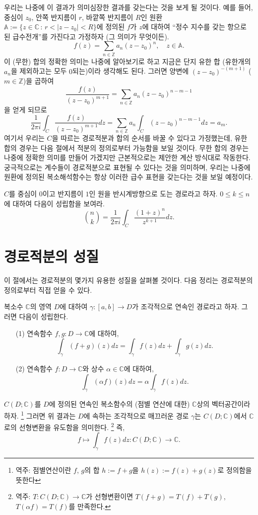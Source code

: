 우리는 나중에 이 결과가 의미심장한 결과를 갖는다는 것을 보게 될 것이다.
예를 들어, 
중심이 $z_0$, 안쪽 반지름이 $r$, 바깥쪽 반지름이 $R$인 
원환 $\mathbb A := \{ z\in\mathbb C \,:\, r<|z-z_0|<R \}$에 정의된
$f$가 $z$에 대하여 ``정수 지수를 갖는 항으로 된 급수전개''를 가진다고 가정하자 
(그 의미가 무엇이든).
\[
f(z) = \sum_{n\in\mathbb Z} a_n (z-z_0)^n, \quad z\in \mathbb A.
\]
이 (무한) 합의 정확한 의미는 나중에 알아보기로 하고
지금은 단지 유한 합 (유한개의 $a_n$을 제외하고는 모두 $0$되는)이라 생각해도 된다.
그러면  양변에 $(z-z_0)^{-(m+1)}$ ($m\in \mathbb Z$)을 곱하여 
\[
\dfrac{f(z)}{(z-z_0)^{m+1}} = \sum_{n\in\mathbb Z} a_n (z-z_0)^{n-m-1}
\]
을 얻게 되므로
\[
\dfrac1{2\pi i} \int_C \frac{f(z)}{(z-z_0)^{m+1}} dz
= \sum_{n\in\mathbb Z} a_n \int_C (z-z_0)^{n-m-1}dz = a_m.
\]
여기서 우리는 $C$을 따르는 경로적분과 합의 순서를 바꿀 수 있다고 가정했는데,
유한 합의 경우는 다음 절에서 적분의 정의로부터 가능함을 보일 것이다.
무한 합의 경우는 나중에 정확한 의미를 만들어 가겠지만 근본적으로는
제안한 계산 방식대로 작동한다.
궁극적으로는 계수들이 경로적분으로 표현될 수 있다는 것을 의미하며,
우리는 나중에 원환에 정의된 복소해석함수는 항상 이러한 급수 표현을 갖는다는 것을
보일 예정이다.

\begin{salt_exercise} \label{ex-3-5}
$C$를 중심이 $0$이고 반지름이 $1$인 원을 반시계방향으로 도는 경로라고 하자.
$0\le k \le n$에 대하여 다음이 성립함을 보여라.
\[
{n \choose k} = \dfrac1{2\pi i}\int_C \dfrac{(1+z)^n}{z^{k+1}} dz.
\]
\end{salt_exercise}

\section{경로적분의 성질}

이 절에서는 경로적분의 몇가지 유용한 성질을 살펴볼 것이다.
다음 정리는 경로적분의 정의로부터 직접 얻을 수 있다.

\begin{salt_prop} \label{prop-3-1}
복소수 $\mathbb C$의 영역 $D$에 대하여
$\gamma: [a,b] \to D$가 조각적으로 연속인 경로라고 하자.
그러면 다음이 성립한다.
\begin{itemize}
\item[(1)] 연속함수 $f,g : D \to \mathbb C$에 대하여,
\[
\int_\gamma (f+g)(z) dz = \int_\gamma f(z)dz + \int_\gamma g(z)dz.
\]
\item[(2)] 연속함수 $f : D \to \mathbb C$와 상수 $\alpha\in\mathbb C$에 대하여,
\[
\int_\gamma  (\alpha f)(z)dz = \alpha \int_\gamma f(z)dz.
\]
\end{itemize}
\end{salt_prop}
$C(D;\mathbb C)$를
$D$에 정의된 연속인 복소함수의 (점별 연산에 대한) $\mathbb C$상의 벡터공간이라 하자.
\footnote{역주: 점별연산이란 $f$, $g$의 합 $h:=f+g$을 $h(z):=f(z)+g(z)$로 정의함을 뜻한다}
그러면 위 결과는 $D$에 속하는 조각적으로 매끄러운 경로 $\gamma$는
$C(D;\mathbb C)$에서 $\mathbb C$로의 선형변환을 유도함을 의미한다.
\footnote{역주: $T: C(D;\mathbb C) \to \mathbb C$가 선형변환이면
$T(f+g) = T(f)+T(g)$, $T(\alpha f) = T(f)$를 만족한다. }
즉,
\[
f \mapsto \int_\gamma f(z)dz : C(D;\mathbb C) \to \mathbb C.
\]


